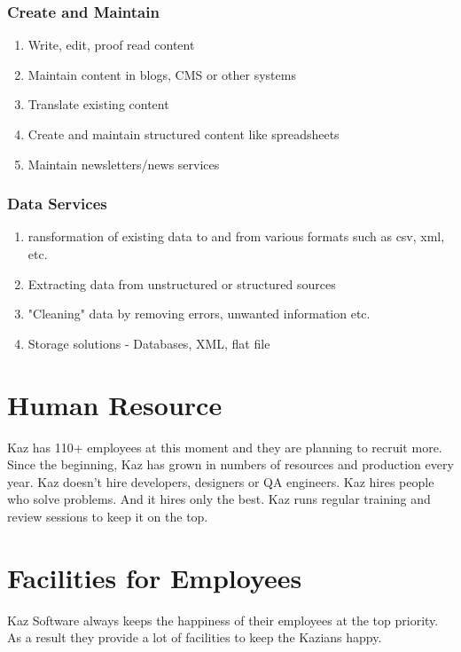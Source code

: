 \subsubsection*{Create and Maintain}

\begin{enumerate}
    \item Write, edit, proof read content
    \item Maintain content in blogs, CMS or other systems
    \item Translate existing content
    \item Create and maintain structured content like spreadsheets
    \item Maintain newsletters/news services
\end{enumerate}

\subsubsection*{Data Services}

\begin{enumerate}
    \item ransformation of existing data to and from various formats such as csv, xml, etc.
    \item Extracting data from unstructured or structured sources
    \item "Cleaning" data by removing errors, unwanted information etc.
    \item Storage solutions - Databases, XML, flat file
\end{enumerate}

\section{Human Resource}

Kaz has 110+ employees at this moment and they are planning to recruit more.
Since the beginning, Kaz has grown in numbers of resources and production every year.
Kaz doesn't hire developers, designers or QA engineers.
Kaz hires people who solve problems.
And it hires only the best.
Kaz runs regular training and review sessions to keep it on the top.

\section{Facilities for Employees}

Kaz Software always keeps the happiness of their employees at the top priority.
As a result they provide a lot of facilities to keep the Kazians happy.


